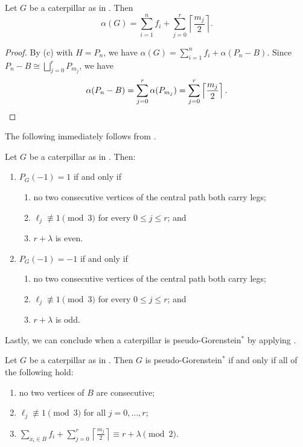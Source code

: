 \documentclass[12pt]{amsart}
\theoremstyle{plain}
\theoremstyle{definition}
\begin{document}
\begin{cor}\label{cor:alpha-caterpillar}
Let \(G\) be a caterpillar as in . Then
\[
\alpha(G)=\sum_{i=1}^n f_i+\sum_{j=0}^r \left\lceil \frac{m_j}{2}\right\rceil.
\]
\end{cor}

\begin{proof}
By \textup{(c)} with \(H=P_n\), we have $\alpha(G)=\sum_{i=1}^n f_i+\alpha(P_n-B)$. Since \(P_n-B\cong \bigsqcup_{j=0}^r P_{m_j}\), we have
\[
\alpha(P_n-B)=\sum_{j=0}^r \alpha(P_{m_j})
=\sum_{j=0}^r \left\lceil \frac{m_j}{2}\right\rceil. \qedhere
\]
\end{proof}

The following immediately follows from .
\begin{cor}\label{cor:caterpillar_pm1_sign}
Let \(G\) be a caterpillar as in . Then:
\begin{enumerate}
    \item \(P_G(-1)=1\) if and only if
    \begin{enumerate}
        \item no two consecutive vertices of the central path both carry legs;
        \item \(\ell_j\not\equiv 1 \pmod 3\) for every \(0\le j\le r\); and
        \item \(r+\lambda\) is even.
    \end{enumerate}

    \item \(P_G(-1)=-1\) if and only if
    \begin{enumerate}
        \item no two consecutive vertices of the central path both carry legs;
        \item \(\ell_j\not\equiv 1 \pmod 3\) for every \(0\le j\le r\); and
        \item \(r+\lambda\) is odd.
    \end{enumerate}
\end{enumerate}
\end{cor}



Lastly, we can conclude when a caterpillar is pseudo-Gorenstein\(^{*}\) by applying .

\begin{cor}\label{cor:pseudogorenstein_star_caterpillar}
Let \(G\) be a caterpillar as in . Then \(G\) is
pseudo-Gorenstein\(^{*}\) if and only if all of the following hold:
\begin{enumerate}
    \item no two vertices of \(B\) are consecutive;
    \item  \(\ell_j\not\equiv 1\pmod 3\) for all \(j=0,\dots,r\);
    \item \(\sum_{x_i\in B} f_i+\sum_{j=0}^{r}\left\lceil \frac{m_j}{2}\right\rceil
    \equiv
    r+\lambda
    \pmod 2\).
\end{enumerate}
\end{cor}
\end{document}
